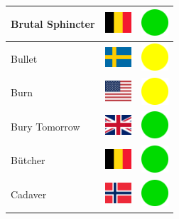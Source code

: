 \documentclass[12pt, a4paper, twoside]{report}
\begin{document}
\begin{center}
\begin{longtable}{|p{5cm}|p{2cm}|p{2cm}|}
 Brutal Sphincter                                           & \includegraphics[width=1cm]{../4x3/be} &   \includegraphics[width=1cm]{../likes/y} \\ \hline
 Bullet                                                     & \includegraphics[width=1cm]{../4x3/se} &   \includegraphics[width=1cm]{../likes/m} \\ \hline
 Burn                                                       & \includegraphics[width=1cm]{../4x3/us} &   \includegraphics[width=1cm]{../likes/m} \\ \hline
 Bury Tomorrow                                              & \includegraphics[width=1cm]{../4x3/gb} &   \includegraphics[width=1cm]{../likes/y} \\ \hline
 Bütcher                                                    & \includegraphics[width=1cm]{../4x3/be} &   \includegraphics[width=1cm]{../likes/y} \\ \hline
 Cadaver                                                    & \includegraphics[width=1cm]{../4x3/no} &   \includegraphics[width=1cm]{../likes/y} \\ \hline

\end{longtable}
\end{center}
\end{document}
